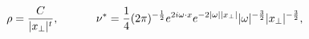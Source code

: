 \begin{equation}\label{fit}
\rho=\frac{C}{|x_\perp|^t},~~~~~~~~~~
\nu^*={1\over4}(2\pi)^{-{1\over2}}
e^{2i\omega\cdot x} e^{-2|\omega||x_\perp|}|\omega|^{-\frac{3}{2}}
|x_\perp|^{-\frac{3}{2}},\end{equation}

